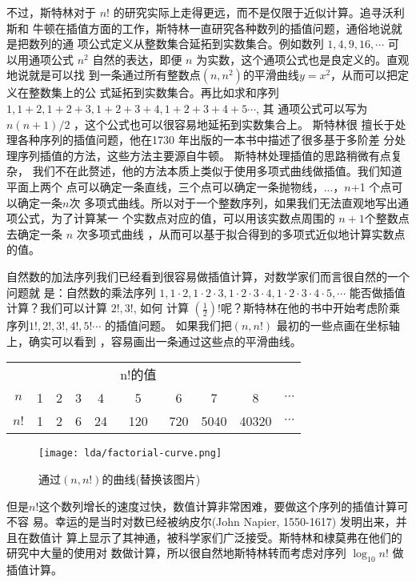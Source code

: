 不过，斯特林对于 $n!$ 的研究实际上走得更远，而不是仅限于近似计算。追寻沃利斯和
牛顿在插值方面的工作，斯特林一直研究各种数列的插值问题，通俗地说就是把数列的通
项公式定义从整数集合延拓到实数集合。例如数列 $1,4,9,16,\cdots$ 可以用通项公式
$n^2$ 自然的表达，即便 $n$ 为实数，这个通项公式也是良定义的。直观地说就是可以找
到一条通过所有整数点$(n,n^2)$的平滑曲线$y=x^2$，从而可以把定义在整数集上的公
式延拓到实数集合。再比如求和序列 $1, 1+2, 1+2+3, 1+2+3+4, 1+2+3+4+5 \cdots$, 其
通项公式可以写为 $n(n+1)/2$ ，这个公式也可以很容易地延拓到实数集合上。 斯特林很
擅长于处理各种序列的插值问题，他在1730 年出版的一本书中描述了很多基于多阶差
分处理序列插值的方法，这些方法主要源自牛顿。 斯特林处理插值的思路稍微有点复杂，
我们不在此赘述，他的方法本质上类似于使用多项式曲线做插值。我们知道平面上两个
点可以确定一条直线，三个点可以确定一条抛物线，...，$n$+1 个点可以确定一条$n$次
多项式曲线。所以对于一个整数序列，如果我们无法直观地写出通项公式，为了计算某一
个实数点对应的值，可以用该实数点周围的 $n+1$个整数点去确定一条 $n$ 次多项式曲线
，从而可以基于拟合得到的多项式近似地计算实数点的值。

自然数的加法序列我们已经看到很容易做插值计算，对数学家们而言很自然的一个问题就
是：自然数的乘法序列 $1,1\cdot2, 1\cdot2\cdot3, 1\cdot2\cdot3\cdot4,
1\cdot2\cdot3\cdot4\cdot5,  \cdots$ 能否做插值计算？我们可以计算 $2!,3!$, 如何
计算 $(\frac{1}{2})!$呢？斯特林在他的书中开始考虑阶乘序列$1!, 2!,3!,4!,5!
\cdots$ 的插值问题。 如果我们把$(n,n!)$ 最初的一些点画在坐标轴上，确实可以看到
，容易画出一条通过这些点的平滑曲线。

\begin{table}[htb]
\centering
\begin{tabular*}{0.9\textwidth}{@{\extracolsep{\fill}}|cccccccccc|}
\hline
&&&&& n!的值 &&&& \\
$n$ & 1 & 2 & 3 & 4 & 5 & 6 & 7 & 8 & $\cdots$ \\
$n!$ & 1 & 2 & 6 & 24 & 120 & 720 & 5040 & 40320 & $\cdots$ \\
\hline
\end{tabular*}
\end{table}


\begin{figure}[htbp]
\centering
\texttt{[image: lda/factorial-curve.png]}
\caption{通过$(n,n!)$的曲线(替换该图片)}
\end{figure}

但是$n!$这个数列增长的速度过快，数值计算非常困难，要做这个序列的插值计算可不容
易。幸运的是当时对数已经被纳皮尔(John Napier, 1550-1617) 发明出来，并且在数值计
算上显示了其神通，被科学家们广泛接受。斯特林和棣莫弗在他们的研究中大量的使用对
数做计算，所以很自然地斯特林转而考虑对序列 $\log_{10} n!$ 做插值计算。 

